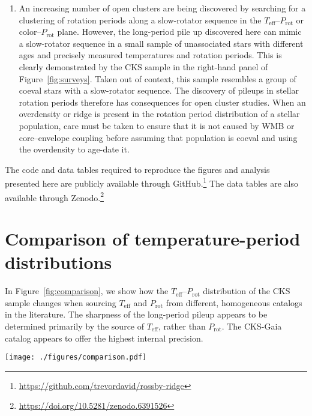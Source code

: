 \documentclass[trackchanges,twocolumn]{aastex631}
\newcommand{\teff}{\ensuremath{T_{\mathrm{eff}}}\xspace}
\newcommand{\prot}{\ensuremath{P_\mathrm{rot}}\xspace}
\begin{document}
\begin{enumerate}
    \item An increasing number of open clusters are being discovered by searching for a clustering of rotation periods along a slow-rotator sequence in the \teff–\prot or color–\prot plane. However, the long-period pile up discovered here can mimic a slow-rotator sequence in a small sample of unassociated stars with different ages and precisely measured temperatures and rotation periods. This is clearly demonstrated by the CKS sample in the right-hand panel of Figure~\ref{fig:surveys}. Taken out of context, this sample resembles a group of coeval stars with a slow-rotator sequence. The discovery of pileups in stellar rotation periods therefore has consequences for open cluster studies. When an overdensity or ridge is present in the rotation period distribution of a stellar population, care must be taken to ensure that it is not caused by WMB or core–envelope coupling before assuming that population is coeval and using the overdensity to age-date it.
    
\end{enumerate}

The code and data tables required to reproduce the figures and analysis presented here are publicly available through GitHub.\footnote{\url{https://github.com/trevordavid/rossby-ridge}} The data tables are also available through Zenodo.\footnote{\url{https://doi.org/10.5281/zenodo.6391526}}

\appendix
\section{Comparison of temperature-period distributions}\label{app:teffprot}
In Figure~\ref{fig:comparison}, we show how the \teff--\prot distribution of the CKS sample changes when sourcing \teff and \prot from different, homogeneous catalogs in the literature. The sharpness of the long-period pileup appears to be determined primarily by the source of \teff, rather than \prot. The CKS-Gaia catalog \citep{Fulton2018} appears to offer the highest internal precision.  

\begin{figure*}
    \centering
    \texttt{[image: ./figures/comparison.pdf]}
    \caption{Comparison of the \teff--\prot distribution for the CKS sample using rotation periods and \teff from the sources indicated by the axes labels.}
    \label{fig:comparison}
\end{figure*}
\end{document}
